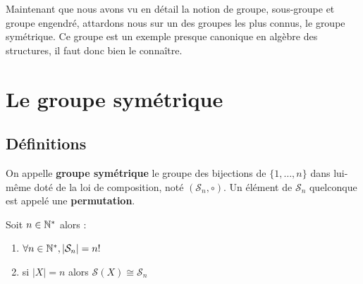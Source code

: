 
\minitoc  %

Maintenant que nous avons vu en détail la notion de groupe, sous-groupe et groupe engendré, 
attardons nous sur un des groupes les plus connus, le groupe symétrique. 
Ce groupe est un exemple presque canonique en algèbre des structures, il faut donc bien le connaître. 


\section{Le groupe symétrique}

\subsection{Définitions}

\begin{definition}
	On appelle \textbf{groupe symétrique} le groupe des bijections de $\{1, \dots ,n\}$ dans lui-même doté de la loi de composition, noté $(\mathcal{S}_n,\circ)$.
	Un élément de $\mathcal{S}_n$ quelconque est appelé une \textbf{permutation}.
\end{definition} 

\begin{prop}
	Soit $n \in \mathbb{N}^*$ alors :
	\begin{enumerate}
		\item $ \forall n \in \mathbb{N}^*, |\mathcal{S}_n| = n ! $
		\item si $ |X| = n $ alors $ \mathcal{S}(X) \cong \mathcal{S}_n $
	\end{enumerate}
\end{prop}


